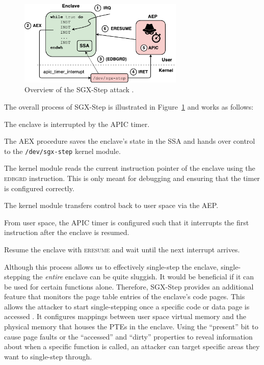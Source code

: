 \documentclass{llncs}
\begin{document}
\begin{figure}[t!]
  \centering
  \includegraphics[width=0.7\textwidth]{images/sgx-step-overview.pdf}
  \caption{Overview of the SGX-Step attack \cite{BulckPS17}.}
  \label{fig:sgx-step}
\end{figure}

The overall process of SGX-Step is illustrated in Figure~\ref{fig:sgx-step} and
works as follows:
\begin{enumerate*}
  \item[\ding{172}]
    The enclave is interrupted by the APIC timer.
  \item[\ding{173}]
    The AEX procedure saves the enclave's state in the SSA and hands over
    control to the \texttt{/dev/sgx-step} kernel module.
  \item[\ding{174}]
    The kernel module reads the current instruction pointer of the enclave
    using the \textsc{edbgrd} instruction.
    This is only meant for debugging and ensuring that the timer is configured
    correctly.
  \item[\ding{175}]
    The kernel module transfers control back to user space via the AEP.
  \item[\ding{176}]
    From user space, the APIC timer is configured such that it interrupts the
    first instruction after the enclave is resumed.
  \item[\ding{177}]
    Resume the enclave with \textsc{eresume} and
    wait until the next interrupt arrives.
\end{enumerate*}

Although this process allows us to effectively single-step the enclave,
single-stepping the \emph{entire} enclave can be quite sluggish.
It would be beneficial if it can be used for certain functions alone.
Therefore, SGX-Step provides an additional feature that monitors the page table
entries of the enclave's code pages.
This allows the attacker to start single-stepping once a specific code or
data page is accessed \cite{BulckWKPS17}.
It configures mappings between user space virtual memory and the physical
memory that houses the PTEs in the enclave.
Using the ``present'' bit to cause page faults \cite{XuCP15} or the
``accessed'' and ``dirty'' properties to reveal information about when a
specific function is called, an attacker can target specific areas they want to
single-step through.
\end{document}
